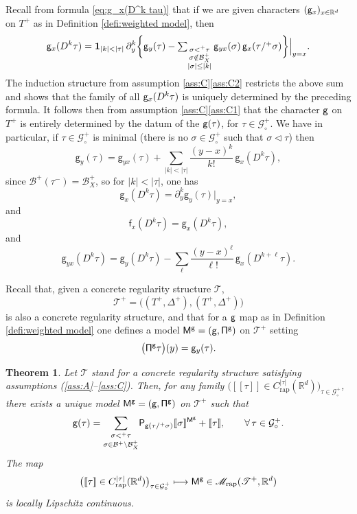 \documentclass[JEP,XML,SOM,Unicode,published]{cedram}
\newcommand\mto{\mathchoice{\longmapsto}{\mapsto}{\mapsto}{\mapsto}}
\theoremstyle{plain}
\newtheorem{thm}{Theorem}
\theoremstyle{definition}
\newcommand{\unit}{\mathbf{1}}
\newcommand{\Brac}[1]{[\![#1]\!]}
\newcommand{\rap}{\mathrm{rap}}
\newcommand{\sfM}{\mathsf{M}}
\newcommand{\sfP}{\mathsf{P}}
\newcommand{\sff}{\mathsf{f}}
\newcommand{\sfg}{\mathsf{g}}
\newcommand{\scrM}{\mathscr{M}}
\newcommand{\scrT}{\mathscr{T}}
\let\spord\triangleleft
\newcommand{\bbR}{\mathbb{R}}
\newcommand{\mcB}{\mathcal{B}}
\newcommand{\mcG}{\mathcal{G}}
\begin{document}
Recall from formula \eqref{eq:g_x(D^k tau)} that if we are given characters $({\sf g}_x)_{x\in\bbR^d}$ on $T^+$ as in Definition \ref{defi:weighted model}, then
\begin{equation} \label{EqGxDkTau}
{\sf g}_x(D^k\tau) = \unit_{|k|<|\tau|}\, \partial_y^k\bigg\{\sfg_y(\tau) - \textstyle\sum_{\substack{\sigma<^+\tau\\\sigma\notin\mcB_X^+\\|\sigma| \le |k|}} \sfg_{yx}(\sigma)\,\sfg_x(\tau/^+\sigma)\bigg\}\Big|_{y=x}.
\end{equation}
The induction structure from assumption \ref{ass:C}\eqref{ass:C2} restricts the above sum and shows that the family of all ${\sf g}_x(D^k\tau)$ is uniquely determined by the preceding formula. It follows then from assumption \ref{ass:C}\eqref{ass:C1} that the character $\sf g$ on $T^+$ is entirely determined by the datum of the ${\sf g}(\tau)$, for $\tau\in\mcG_\circ^+$. We have in particular, if $\tau\in\mcG_\circ^+$ is minimal (\ie there is no $\sigma\in\mcG_\circ^+$ such that $\sigma\spord\tau$) then
\[
\sfg_y(\tau) = \sfg_{yx}(\tau) + \sum_{\vert k\vert<\vert\tau\vert}\frac{(y-x)^k}{k!}\,\sfg_x(D^k\tau),
\]
since $\mcB^+(\tau^-)=\mcB_X^+$, so for $\vert k\vert<\vert\tau\vert$, one has
\begin{equation} \label{EqDefnGD}
\sfg_x(D^k\tau) = \partial^k_y\sfg_y(\tau)\big\vert_{y=x},
\end{equation}
and
\[
\sff_x(D^k\tau) = \sfg_x(D^k\tau),
\]
and
\begin{equation} \label{EqDefnG2D}
\sfg_{yx}(D^k\tau) = \sfg_y(D^k\tau) - \sum_\ell \frac{(y-x)^\ell}{\ell !}\,\sfg_x(D^{k+\ell}\tau).
\end{equation}

Recall that, given a concrete regularity structure $\scrT$,
\[
\scrT^+ = \bigl((T^+,\Delta^+),(T^+,\Delta^+)\bigr)
\]
is also a concrete regularity structure, and that for a $\sf g$ map as in Definition \ref{defi:weighted model} one defines a model ${\sf M^g = (g,\Pi^g)}$ on $\scrT^+$ setting
\[
\bigl({\sf \Pi^g}\tau\bigr)(y) = {\sf g}_{y}(\tau).
\]

\begin{thm} \label{mainresult:reconst of g}
Let $\scrT$ stand for a concrete regularity structure satisfying assumptions \textup{(\ref{ass:A}--\ref{ass:C})}. Then, for any family $\bigl(\Brac{\tau}\in C^{|\tau|}_\rap(\bbR^d)\bigr)_{\tau\in\mcG^+_\circ}$, there exists a unique model $\sfM^{\sf g} = (\sfg,{\sf\Pi}^\sfg)$ on $\scrT^+$ such that
\begin{equation} \label{EqgTau}
{\sf g}(\tau) = \underset{\sigma\in\mcB^+\setminus \mcB_X^+}{\sum_{\sigma<^+\tau}} \sfP_{\sfg(\tau/^+\sigma)}\Brac{\sigma}^{{\sf M}^{\sfg}} + \Brac{\tau}, \qquad \forall\,\tau\in\mcG^+_\circ.
\end{equation}
The map
\begin{equation} \label{EqMap}
\bigl(\Brac{\tau}\in C^{|\tau|}_\rap(\bbR^d)\bigr)_{\tau\in\mcG^+_\circ} \mto {\sf M^g}\in\scrM_\rap(\scrT^+,\bbR^d)
\end{equation}
is locally Lipschitz continuous.
\end{thm}
\end{document}
